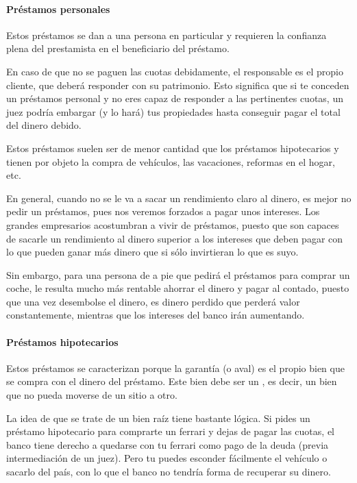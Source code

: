 \documentclass[nochap,palatino,shortheader]{apuntes}
\newcommand{\study}[1]{#1} \newcommand{\substudy}[1]{#1}
\begin{document}
\paragraph{Préstamos personales\\}
Estos préstamos \substudy{se dan a una persona en particular} y \study{requieren} la \study{confianza plena} del prestamista en el beneficiario del préstamo.

En caso de que no se paguen las cuotas debidamente, el responsable es el propio cliente, que deberá \study{responder con su patrimonio}.
Esto significa que si te conceden un préstamos personal y no eres capaz de responder a las pertinentes cuotas, un juez podría embargar (y lo hará) tus propiedades hasta conseguir pagar el total del dinero debido.

Estos préstamos suelen ser de menor cantidad que los préstamos hipotecarios y tienen por objeto la compra de vehículos, las vacaciones, reformas en el hogar, etc.

En general, cuando no se le va a sacar un rendimiento claro al dinero, es mejor no pedir un préstamos, pues nos veremos forzados a pagar unos intereses. Los grandes empresarios acostumbran a vivir de préstamos, puesto que son capaces de sacarle un rendimiento al dinero superior a los intereses que deben pagar con lo que pueden ganar más dinero que si sólo invirtieran lo que es suyo.

Sin embargo, para una persona de a pie que pedirá el préstamos para comprar un coche, le resulta mucho más rentable ahorrar el dinero y pagar al contado, puesto que una vez desembolse el dinero, es dinero perdido que perderá valor constantemente, mientras que los intereses del banco irán aumentando.

\paragraph{Préstamos hipotecarios\\}
Estos préstamos se caracterizan porque la garantía (o \study{aval}) es \substudy{el propio bien que se compra} con el dinero del préstamo. Este bien \study{debe ser} un , es decir, \substudy{un bien que no pueda moverse de un sitio a otro}.

La idea de que se trate de un bien raíz tiene bastante lógica. Si pides un préstamo hipotecario para comprarte un ferrari y dejas de pagar las cuotas, el banco tiene derecho a quedarse con tu ferrari como pago de la deuda (previa intermediación de un juez). Pero tu puedes esconder fácilmente el vehículo o sacarlo del país, con lo que el banco no tendría forma de recuperar su dinero.
\end{document}
